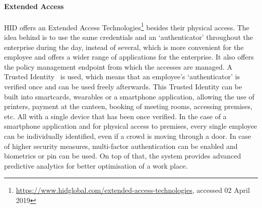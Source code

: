 \paragraph{Extended Access}
HID offers an Extended Access Technologies\footnote{\url{ https://www.hidglobal.com/extended-access-technologies}, accessed 02 April 2019} besides their physical access. The idea behind is to use the same credentials and an `authenticator' throughout the enterprise during the day, instead of several, which is more convenient for the employee and offers a wider range of applications for the enterprise. It also offers the policy management endpoint from which the accesses are managed. A Trusted Identity~\cite{2018ExperiencingPredictive} is used, which means that an employee’s ‘authenticator’ is verified once and can be used freely afterwards. This Trusted Identity can be built into smartcards, wearables or a smartphone application, allowing the use of printers, payment at the canteen, booking of meeting rooms, accessing premises, etc. All with a single device that has been once verified. In the case of a smartphone application and for physical access to premises, every single employee can be individually identified, even if a crowd is moving through a door. In case of higher security measures, multi-factor authentication can be enabled and biometrics or \acrshort{pin} can be used. On top of that, the system provides advanced predictive analytics for better optimisation of a work place. 
